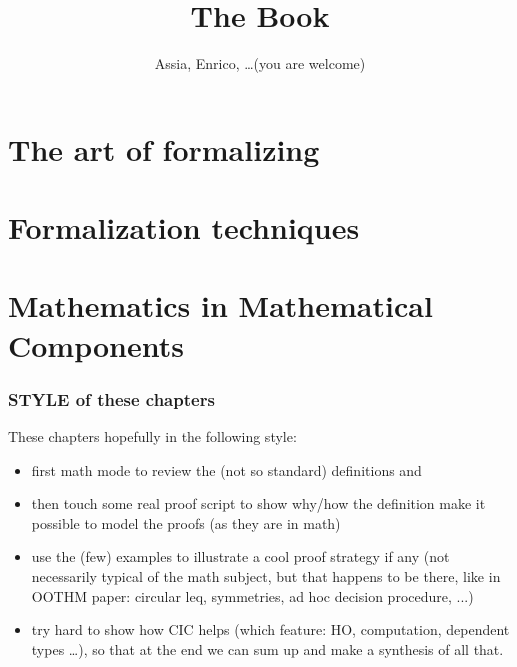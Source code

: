 \documentclass{book}
\title{The Book}
\author{Assia, Enrico, \ldots (you are welcome)}
\begin{document}
\maketitle
\tableofcontents{}

% 



\part{The art of formalizing}






\part{Formalization techniques}







\part{Mathematics in Mathematical Components}


\section{STYLE of these chapters}
These chapters hopefully in the following style:
\begin{itemize}
\item first math mode to review the (not so standard) definitions and
\item then touch some real proof script to show why/how the definition
  make it possible to model the proofs (as they are in math)
\item use the (few) examples to illustrate a cool proof strategy if
  any (not necessarily typical of the math subject, but that happens to
  be there, like in OOTHM paper: circular leq, symmetries, ad hoc
  decision procedure, ...)
\item try hard to show how CIC helps (which feature: HO, computation, dependent
	types \ldots), so that at the end we can sum up and make a synthesis of
	all that.
\end{itemize}
\end{document}
